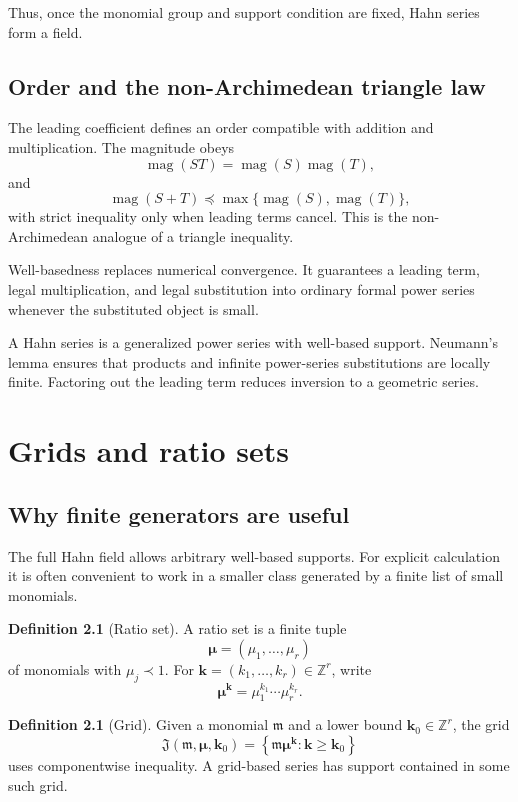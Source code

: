 \documentclass[11pt,oneside]{book}
\theoremstyle{definition}
\newtheorem{definition}[theorem]{Definition}
\theoremstyle{remark}
\newcommand{\Z}{\mathbb{Z}}
\newcommand{\m}{\mathfrak{m}}
\newcommand{\magop}{\operatorname{mag}}
\newcommand{\precdom}{\prec}
\newcommand{\precsimdom}{\preccurlyeq}
\begin{document}
Thus, once the monomial group and support condition are fixed, Hahn series form
a field.

\section{Order and the non-Archimedean triangle law}

The leading coefficient defines an order compatible with addition and
multiplication. The magnitude obeys
\[
  \magop(ST)=\magop(S)\magop(T),
\]
and
\[
  \magop(S+T)\precsimdom\max\{\magop(S),\magop(T)\},
\]
with strict inequality only when leading terms cancel. This is the
non-Archimedean analogue of a triangle inequality.

\begin{bigidea}
Well-basedness replaces numerical convergence. It guarantees a leading term,
legal multiplication, and legal substitution into ordinary formal power series
whenever the substituted object is small.
\end{bigidea}

\begin{summarybox}
A Hahn series is a generalized power series with well-based support. Neumann's
lemma ensures that products and infinite power-series substitutions are locally
finite. Factoring out the leading term reduces inversion to a geometric series.
\end{summarybox}

\chapter{Grids and ratio sets}
\label{ch:grids}

\section{Why finite generators are useful}

The full Hahn field allows arbitrary well-based supports. For explicit
calculation it is often convenient to work in a smaller class generated by a
finite list of small monomials.

\begin{definition}[Ratio set]
A ratio set is a finite tuple
\[
  \boldsymbol\mu=(\mu_1,\ldots,\mu_r)
\]
of monomials with $\mu_j\precdom1$.
For $\bm k=(k_1,\ldots,k_r)\in\Z^r$, write
\[
  \boldsymbol\mu^{\bm k}
  =\mu_1^{k_1}\cdots\mu_r^{k_r}.
\]
\end{definition}

\begin{definition}[Grid]
Given a monomial $\m$ and a lower bound $\bm k_0\in\Z^r$, the grid
\[
  \mathfrak{J}(\m,\boldsymbol\mu,\bm k_0)
  =\left\{\m\boldsymbol\mu^{\bm k}:\bm k\ge\bm k_0\right\}
\]
uses componentwise inequality. A grid-based series has support contained in
some such grid.
\end{definition}
\end{document}
